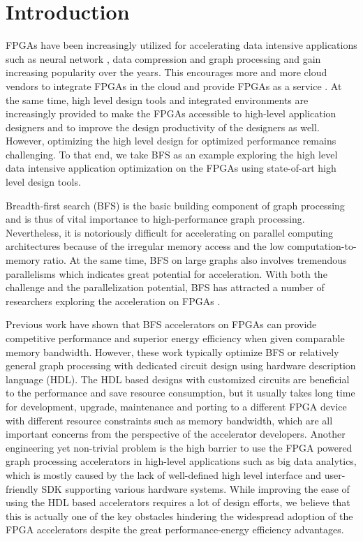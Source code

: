 \section{Introduction} \label{sec:intro}
FPGAs have been increasingly utilized for accelerating data intensive applications 
such as neural network \cite{Zhao2017accelerating, Zhang2017improving,
Zhang2017frequency, guan2017fpdnn}, data compression \cite{fowers2015scalable} 
and graph processing \cite{Dai2017foregraph, zhou2016high} and gain increasing 
popularity over the years. This encourages more and more cloud vendors to integrate FPGAs 
in the cloud and provide FPGAs as a service \cite{f1, nimbix, baidu-cloud, aliyun, supervessel}. 
At the same time, high level design tools 
and integrated environments are increasingly provided to make the FPGAs accessible to 
high-level application designers and to improve the design productivity of 
the designers as well. However, optimizing the high level design for 
optimized performance remains challenging. To that end, we take 
BFS as an example exploring the high level data intensive application 
optimization on the FPGAs using state-of-art high level design tools. 
 
Breadth-first search (BFS) is the basic building component of graph processing and 
is thus of vital importance to high-performance graph processing. Nevertheless, 
it is notoriously difficult for accelerating on parallel 
computing architectures because of the irregular memory access and the low 
computation-to-memory ratio. At the same time, BFS on large graphs also involves 
tremendous parallelisms which indicates great potential for acceleration. 
With both the challenge and the parallelization potential, 
BFS has attracted a number of researchers exploring the acceleration on FPGAs 
\cite{attia2014cygraph, betkaoui2012reconfigurable, Dai2017foregraph, Ma2017fpga,
umuroglu2015hybrid, oguntebi2016graphops, engelhardt2016gravf, zhou2016high}. 

Previous work have shown that BFS accelerators on FPGAs can provide competitive  
performance and superior energy efficiency when given comparable memory bandwidth. 
However, these work typically optimize BFS or relatively general graph processing 
with dedicated circuit design using hardware description language (HDL). The HDL 
based designs with customized circuits are beneficial to the performance 
and save resource consumption, but it usually takes long time for development, 
upgrade, maintenance and porting to a different FPGA device with 
different resource constraints such as memory bandwidth, which are all 
important concerns from the perspective of the accelerator developers. Another 
engineering yet non-trivial problem is the high barrier to use the FPGA powered graph 
processing accelerators in high-level applications such as 
big data analytics, which is mostly caused by the lack of 
well-defined high level interface and user-friendly SDK supporting 
various hardware systems. While improving the ease of using the 
HDL based accelerators requires a lot of design efforts, we believe 
that this is actually one of the key obstacles hindering the 
widespread adoption of the FPGA accelerators despite the great 
performance-energy efficiency advantages.

